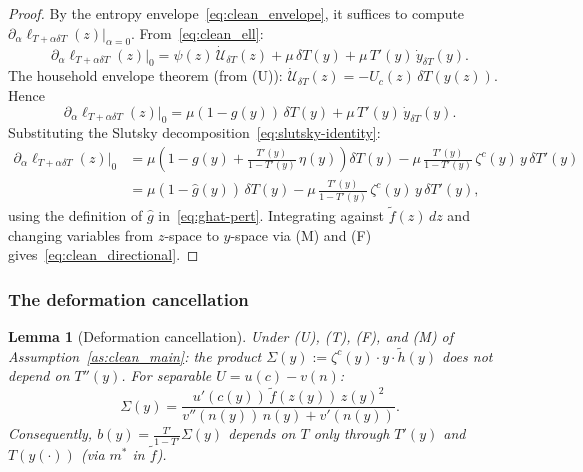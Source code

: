 \documentclass[12pt,a4paper]{article}
\theoremstyle{definition}
\theoremstyle{plain}
\newtheorem{lemma}{Lemma}[section]
\theoremstyle{remark}
\newcommand{\calU}{\mathcal{U}}
\begin{document}
\begin{proof}
By the entropy envelope~\eqref{eq:clean_envelope}, it suffices to compute $\partial_\alpha \ell_{T+\alpha\delta T}(z)|_{\alpha=0}$.  From~\eqref{eq:clean_ell}:
\[
  \partial_\alpha \ell_{T+\alpha\delta T}(z)\big|_0
  = \psi(z)\,\dot{\calU}_{\delta T}(z) + \mu\,\delta T(y) + \mu\,T'(y)\,\dot y_{\delta T}(y).
\]
The household envelope theorem (from \textup{(U)}): $\dot{\calU}_{\delta T}(z) = -U_c(z)\,\delta T(y(z))$.  Hence
\[
  \partial_\alpha \ell_{T+\alpha\delta T}(z)\big|_0
  = \mu(1-g(y))\,\delta T(y) + \mu\,T'(y)\,\dot y_{\delta T}(y).
\]
Substituting the Slutsky decomposition~\eqref{eq:slutsky-identity}:
\begin{align*}
  \partial_\alpha \ell_{T+\alpha\delta T}(z)\big|_0
  &= \mu\!\left(1-g(y)+\frac{T'(y)}{1-T'(y)}\,\eta(y)\right)\delta T(y)
  - \mu\,\frac{T'(y)}{1-T'(y)}\,\zeta^c(y)\,y\,\delta T'(y) \\
  &= \mu(1-\hat g(y))\,\delta T(y)
  - \mu\,\frac{T'(y)}{1-T'(y)}\,\zeta^c(y)\,y\,\delta T'(y),
\end{align*}
using the definition of $\hat g$ in~\eqref{eq:ghat-pert}.  Integrating against $\widetilde{f}(z)\,dz$ and changing variables from $z$-space to $y$-space via \textup{(M)} and \textup{(F)} gives~\eqref{eq:clean_directional}.
\end{proof}


\subsubsection{The deformation cancellation}

\begin{lemma}[Deformation cancellation]
\label{lem:clean_cancel}
Under \textup{(U)}, \textup{(T)}, \textup{(F)}, and \textup{(M)} of Assumption~\ref{as:clean_main}: the product $\Sigma(y) := \zeta^c(y)\cdot y\cdot\widetilde{h}(y)$ does not depend on $T''(y)$.  For separable $U = u(c) - v(n)$:
\begin{equation}
\label{eq:clean_Sigma_sep}
  \Sigma(y) = \frac{u'(c(y))\,\widetilde{f}(z(y))\,z(y)^2}{v''(n(y))\,n(y) + v'(n(y))}.
\end{equation}
Consequently, $b(y) = \frac{T'}{1-T'}\Sigma(y)$ depends on $T$ only through $T'(y)$ and $T(y(\cdot))$ (via $m^*$ in $\widetilde{f}$).
\end{lemma}
\end{document}
